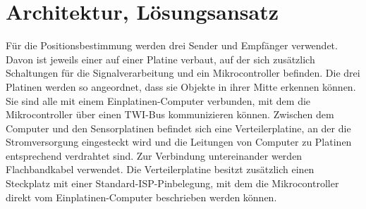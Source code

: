 \section{Architektur, Lösungsansatz} %
Für die Positionsbestimmung werden drei Sender und Empfänger verwendet. Davon ist jeweils einer auf einer Platine verbaut, auf der sich zusätzlich Schaltungen für die Signalverarbeitung und ein Mikrocontroller befinden. Die drei Platinen werden so angeordnet, dass sie Objekte in ihrer Mitte erkennen können. Sie sind alle mit einem Einplatinen-Computer verbunden, mit dem die Mikrocontroller über einen \ac{TWI}-Bus kommunizieren können. Zwischen dem Computer und den Sensorplatinen befindet sich eine Verteilerplatine, an der die Stromversorgung eingesteckt wird und die Leitungen von Computer zu Platinen entsprechend verdrahtet sind. %
Zur Verbindung untereinander werden Flachbandkabel verwendet. Die Verteilerplatine besitzt zusätzlich einen Steckplatz mit einer Standard-\ac{ISP}-Pinbelegung, mit dem die Mikrocontroller direkt vom Einplatinen-Computer beschrieben werden können.\\
